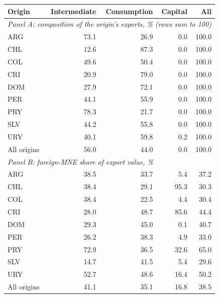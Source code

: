 \begin{tabular}{lrrrr}
\toprule
Origin & Intermediate & Consumption & Capital & All \\
\midrule
\multicolumn{5}{l}{\textit{Panel A: composition of the origin's exports, \% (rows sum to 100)}} \\
ARG & 73.1 & 26.9 & 0.0 & 100.0 \\
CHL & 12.6 & 87.3 & 0.0 & 100.0 \\
COL & 49.6 & 50.4 & 0.0 & 100.0 \\
CRI & 20.9 & 79.0 & 0.0 & 100.0 \\
DOM & 27.9 & 72.1 & 0.0 & 100.0 \\
PER & 44.1 & 55.9 & 0.0 & 100.0 \\
PRY & 78.3 & 21.7 & 0.0 & 100.0 \\
SLV & 44.2 & 55.8 & 0.0 & 100.0 \\
URY & 40.1 & 59.8 & 0.2 & 100.0 \\
All origins & 56.0 & 44.0 & 0.0 & 100.0 \\
\midrule
\multicolumn{5}{l}{\textit{Panel B: foreign-MNE share of export value, \%}} \\
ARG & 38.5 & 33.7 & 5.4 & 37.2 \\
CHL & 38.4 & 29.1 & 95.3 & 30.3 \\
COL & 38.4 & 22.5 & 4.4 & 30.4 \\
CRI & 28.0 & 48.7 & 85.6 & 44.4 \\
DOM & 29.3 & 45.0 & 0.1 & 40.7 \\
PER & 26.2 & 38.3 & 4.9 & 33.0 \\
PRY & 72.9 & 36.5 & 32.6 & 65.0 \\
SLV & 14.7 & 41.5 & 5.4 & 29.6 \\
URY & 52.7 & 48.6 & 16.4 & 50.2 \\
All origins & 41.1 & 35.1 & 16.8 & 38.5 \\
\bottomrule
\end{tabular}
